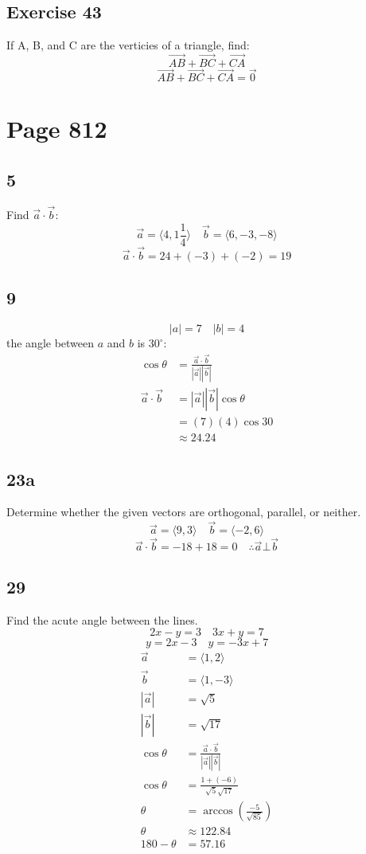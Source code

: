 \documentclass[letterpaper, 12pt]{math}
\begin{document}
\subsection*{Exercise 43}
If A, B, and C are the verticies of a triangle, find:
\[ \vec{AB}+\vec{BC}+\vec{CA} \]
\[ \vec{AB}+\vec{BC}+\vec{CA} = \vec{0} \]

\section*{Page 812}

\subsection*{5}
Find \( \vec{a}\cdot\vec{b} \):
\[ \vec{a} = \langle4,1\frac{1}{4}\rangle \quad
  \vec{b} = \langle6,-3,-8\rangle \]
\[ \vec{a}\cdot\vec{b} = 24+(-3)+(-2) = 19 \]

\subsection*{9}
\[ |a| = 7 \quad |b| = 4 \]
the angle between \( a \) and \( b \) is \( 30^{\circ} \):
\begin{align*}
  \cos\theta &= \frac{\vec{a}\cdot\vec{b}}{|\vec{a}||\vec{b}|} \\
  \vec{a}\cdot\vec{b} &= |\vec{a}||\vec{b}|\cos\theta \\
  &= (7)(4)\cos30 \\
  &\approx 24.24
\end{align*}

\subsection*{23a}
Determine whether the given vectors are orthogonal, parallel, or neither.
\[ \vec{a} = \langle9,3\rangle \quad \vec{b} = \langle-2,6\rangle \]
\[ \vec{a}\cdot\vec{b} = -18+18 = 0 \quad\therefore \vec{a}\bot\vec{b} \]

\subsection*{29}
Find the acute angle between the lines.
\[ 2x-y = 3 \quad 3x+y = 7 \]
\[ y = 2x-3 \quad y = -3x+7 \]
\begin{align*}
  \vec{a} &= \langle1,2\rangle \\
  \vec{b} &= \langle1,-3\rangle \\
  |\vec{a}| &= \sqrt{5} \\
  |\vec{b}| &= \sqrt{17} \\
  \cos\theta &= \frac{\vec{a}\cdot\vec{b}}{|\vec{a}||\vec{b}|} \\
  \cos\theta &= \frac{1+(-6)}{\sqrt{5}\sqrt{17}} \\
  \theta &= \arccos(\frac{-5}{\sqrt{85}}) \\
  \theta &\approx 122.84 \\
  180-\theta &= 57.16
\end{align*}
\end{document}
